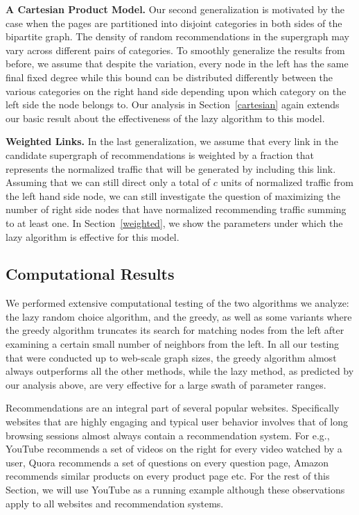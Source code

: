 {\bf A Cartesian Product Model.} Our second generalization is motivated by the case when the pages are partitioned into disjoint categories in both sides of the bipartite graph. The density of random recommendations in the supergraph may vary across different pairs of categories. To smoothly generalize the results from before, we assume that despite the variation, every node in the left has the same final fixed degree while this bound can be distributed differently between the various categories on the right hand side depending upon which category on the left side the node belongs to.  Our analysis in Section~\ref{cartesian} again extends our basic result about the effectiveness of the lazy algorithm to this model.

{\bf Weighted Links.} In the last generalization, we assume that every link in the candidate supergraph of recommendations is weighted by a fraction that represents the normalized traffic that will be generated by including this link. Assuming that we can still direct only a total of $c$ units of normalized traffic from the left hand side node, we can still investigate the question of maximizing the number of right side nodes that have normalized recommending traffic summing to at least one. In Section~\ref{weighted}, we show the parameters under which the lazy algorithm is effective for this model. 

\subsection{Computational Results}
We performed extensive computational testing of the two algorithms we analyze: the lazy random choice algorithm, and the greedy, as well as some variants where the greedy algorithm truncates its search for matching nodes from the left after examining a certain small number of neighbors from the left. In all our testing that were conducted up to web-scale graph sizes, the greedy algorithm almost always outperforms all the other methods, while the lazy method, as predicted by our analysis above, are very effective for a large swath of parameter ranges. 


\iffalse

Recommendations are an integral part of several popular websites. Specifically
websites that are highly engaging and typical user behavior involves that
of long browsing sessions almost always contain a recommendation system. For
e.g., YouTube recommends a set of videos on the right for every video watched
by a user, Quora recommends a set of questions on every question page, Amazon
recommends similar products on every product page etc. For the rest of this Section,
we will use YouTube as a running example although these observations apply to
all websites and recommendation systems. \vs

